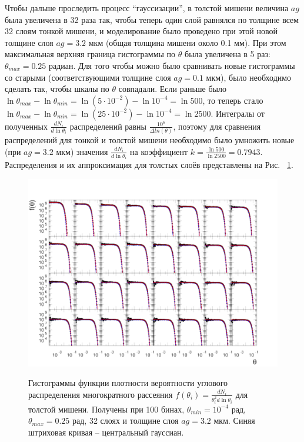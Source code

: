 \documentclass[a4paper,12pt]{article}
\begin{document}
\begin{large}
  Чтобы дальше проследить процесс ``гауссизации'', в толстой мишени величина $ag$ была увеличена в 32 раза так, чтобы теперь один слой равнялся по толщине  всем 32 слоям тонкой мишени, и моделирование было проведено при этой новой толщине слоя $ag=3.2$ мкм (общая толщина мишени около 0.1 мм).
  При этом максимальная верхняя граница гистограммы по $\theta$ была увеличена в 5 раз: $\theta_{max}=0.25$ радиан.
  Для того чтобы можно было сравнивать новые гистограммы со старыми (соответствующими толщине слоя $ag=0.1$ мкм), было необходимо сделать так, чтобы шкалы по $\theta$ совпадали.
  Если раньше было $\ln{\theta_{max}}-\ln{\theta_{min}}=\ln{\left( 5\cdot10^{-2} \right)}-\ln{10^{-4}}=\ln{500}$, то теперь стало $\ln{\theta_{max}}-\ln{\theta_{min}}=\ln{\left( 25\cdot10^{-2} \right)}-\ln{10^{-4}}=\ln{2500}$.
  Интегралы от полученных $\frac{dN_i}{d\ln{\theta_i}}$ распределений равны $\frac{10^6}{\Delta ln(\theta)}$, поэтому для сравнения распределений для тонкой и толстой мишени необходимо было умножить новые (при $ag=3.2$ мкм) значения $\frac{dN_i}{d\ln{\theta_i}}$ на коэффициент $k=\frac{\ln{500}}{\ln{2500}}=0.7943$.
  Распределения и их аппроксимация для толстых слоёв представлены на Рис. ~\ref{fig:Thick_theta}.

  \begin{figure}[ht]
    {
       \includegraphics[width=.99\linewidth]{images/thick_theta}
    }
    \caption{Гистограммы функции плотности вероятности углового распределения многократного рассеяния $f(\theta_i)=\frac{dN_i}{\theta_i^2d\ln{\theta_i}}$ для толстой мишени. Получены при 100 бинах, $\theta_{min}=10^{-4}$ рад, $\theta_{max}=0.25$ рад, 32 слоях и толщине слоя $ag=3.2$ мкм. Синяя штриховая кривая -- центральный гауссиан.}
    \label{fig:Thick_theta}
  \end{figure}


\end{large}
\end{document}
